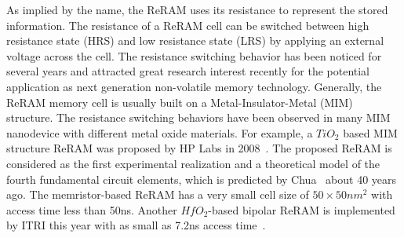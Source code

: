 As implied by the name, the ReRAM uses its resistance to represent the stored information. The resistance of a ReRAM cell can be switched between high resistance state (HRS) and low resistance state (LRS) by applying an external voltage across the cell. The resistance switching behavior has been noticed for several years and attracted great research interest recently for the potential application as next generation non-volatile memory technology. Generally, the ReRAM memory cell is usually built on a Metal-Insulator-Metal (MIM) structure. The resistance switching behaviors have been observed in many MIM nanodevice with different metal oxide materials. For example, a $TiO_2$ based MIM structure ReRAM was proposed by HP Labs in 2008~\cite{memristor:missing}. The proposed ReRAM is considered as the first experimental realization and a theoretical model of the fourth fundamental circuit elements, which is predicted by Chua~\cite{memristor:chua} about 40 years ago. The memristor-based ReRAM has a very small cell size of $50\times50 nm^2$ with access time less than 50ns. Another $HfO_2$-based bipolar ReRAM is implemented by ITRI this year with as small as 7.2ns access time~\cite{memristor:ISSCC2011_ITRI}.


